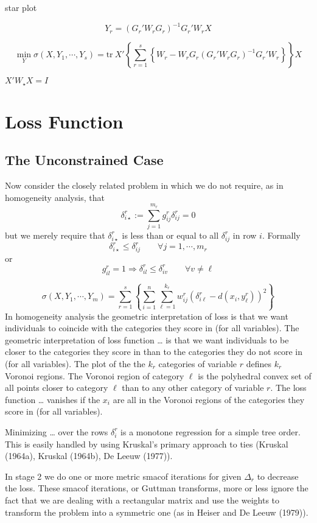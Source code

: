 \documentclass[
  12pt,
]{article}
\begin{document}
star plot

\[Y_r=(G_r'W_rG_r)^{-1}G_r'W_rX\]

\[
\min_Y\sigma(X,Y_1,\cdots,Y_s)=\text{tr}\ X'\left\{\sum_{r=1}^s\left\{W_r-W_rG_r(G_r'W_rG_r)^{-1}G_r'W_r\right\}\right\}X
\]

\(X'W_\star X=I\)

\section{Loss Function}\label{loss-function}

\subsection{The Unconstrained Case}\label{the-unconstrained-case}

Now consider the closely related problem in which we do not require,
as in homogeneity analysis, that
\[
\delta_{i\star}^r:=\sum_{j=1}^{m_r}g_{ij}^r\delta_{ij}^r=0
\]
but we merely require that \(\delta_{i\star}^r\) is less than or equal to all
\(\delta_{ij}^r\) in row \(i\). Formally
\[
\delta_{i\star}^r\leq\delta_{ij}^r\qquad\forall j=1,\cdots,m_r
\]
or
\[
g^r_{il}=1\Rightarrow\delta^r_{il}\leq\delta^r_{iv}\qquad\forall v\not=\ell
\]

\[
\sigma(X,Y_1,\cdots,Y_m) = 
\sum_{r=1}^s\left\{\sum_{i=1}^n\sum_{\ell=1}^{k_r}w_{ij}^r(\delta_{i\ell}^r-d(x_i,y_\ell^r))^2\right\}
\]
In homogeneity analysis the geometric interpretation of loss is that we
want individuals to coincide with the categories they score in (for all variables). The geometric interpretation of loss function \ldots{} is that we want
individuals to be closer to the categories they score in than to the categories
they do not score in (for all variables). The plot of the the \(k_r\) categories of
variable \(r\) defines \(k_r\) Voronoi regions. The Voronoi region of
category \(\ell\) is the polyhedral convex set of all points closer to category
\(\ell\) than to any other category of variable \(r\). The loss function
\ldots{} vanishes if the \(x_i\) are all in the Voronoi regions of the categories
they score in (for all variables).

Minimizing \ldots{} over the rows \(\delta_i^r\) is a monotone regression for a simple tree order. This is easily handled by using Kruskal's primary approach
to ties (Kruskal (1964a), Kruskal (1964b), De Leeuw (1977)).

In stage 2 we do one or more metric smacof iterations for given \(\Delta_r\)
to decrease the loss. These smacof iterations, or Guttman transforms, more or less ignore the fact that we are dealing with a rectangular matrix and use the weights to transform the problem into a symmetric one (as in Heiser and De Leeuw (1979)).
\end{document}
